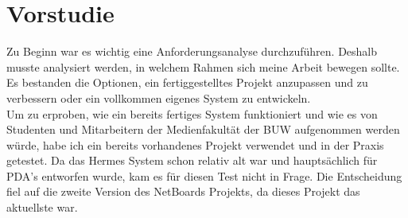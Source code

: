 \chapter{Vorstudie}\label{Vorstudie}
Zu Beginn war es wichtig eine Anforderungsanalyse durchzuführen. Deshalb musste analysiert werden, in welchem Rahmen sich meine Arbeit bewegen sollte. Es bestanden die Optionen, ein fertiggestelltes Projekt anzupassen und zu verbessern oder ein vollkommen eigenes System zu entwickeln.
\\
Um zu erproben, wie ein bereits fertiges System funktioniert und wie es von Studenten und Mitarbeitern der Medienfakultät der BUW aufgenommen werden würde, habe ich ein bereits vorhandenes Projekt verwendet und in der Praxis getestet.
Da das Hermes System schon relativ alt war und hauptsächlich für PDA's entworfen wurde, kam es für diesen Test nicht in Frage.
Die Entscheidung fiel auf die zweite Version des NetBoards Projekts\cite{netboards:website}, da dieses Projekt das aktuellste war.
